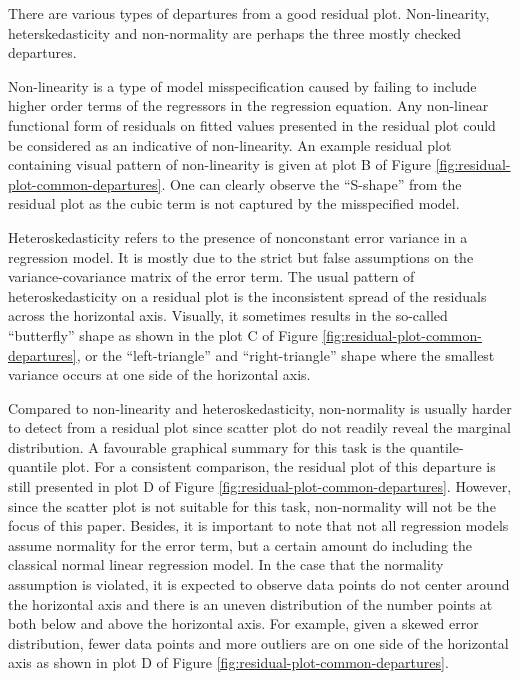 \documentclass[]{interact}
\theoremstyle{plain}%
\theoremstyle{definition}
\theoremstyle{remark}
\begin{document}
There are various types of departures from a good residual plot.
Non-linearity, heterskedasticity and non-normality are perhaps the three
mostly checked departures.

Non-linearity is a type of model misspecification caused by failing to
include higher order terms of the regressors in the regression equation.
Any non-linear functional form of residuals on fitted values presented
in the residual plot could be considered as an indicative of
non-linearity. An example residual plot containing visual pattern of
non-linearity is given at plot B of Figure
\ref{fig:residual-plot-common-departures}. One can clearly observe the
``S-shape'' from the residual plot as the cubic term is not captured by
the misspecified model.

Heteroskedasticity refers to the presence of nonconstant error variance
in a regression model. It is mostly due to the strict but false
assumptions on the variance-covariance matrix of the error term. The
usual pattern of heteroskedasticity on a residual plot is the
inconsistent spread of the residuals across the horizontal axis.
Visually, it sometimes results in the so-called ``butterfly'' shape as
shown in the plot C of Figure \ref{fig:residual-plot-common-departures},
or the ``left-triangle'' and ``right-triangle'' shape where the smallest
variance occurs at one side of the horizontal axis.

Compared to non-linearity and heteroskedasticity, non-normality is
usually harder to detect from a residual plot since scatter plot do not
readily reveal the marginal distribution. A favourable graphical summary
for this task is the quantile-quantile plot. For a consistent
comparison, the residual plot of this departure is still presented in
plot D of Figure \ref{fig:residual-plot-common-departures}. However,
since the scatter plot is not suitable for this task, non-normality will
not be the focus of this paper. Besides, it is important to note that
not all regression models assume normality for the error term, but a
certain amount do including the classical normal linear regression
model. In the case that the normality assumption is violated, it is
expected to observe data points do not center around the horizontal axis
and there is an uneven distribution of the number points at both below
and above the horizontal axis. For example, given a skewed error
distribution, fewer data points and more outliers are on one side of the
horizontal axis as shown in plot D of Figure
\ref{fig:residual-plot-common-departures}.
\end{document}
